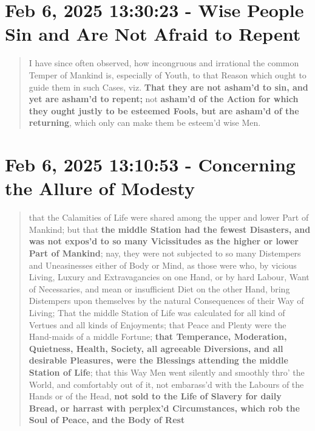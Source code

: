 \documentclass[a4paper]{article}
\begin{document}
\section{Feb 6, 2025 13:30:23 - Wise People Sin and Are Not Afraid to Repent}
\label{SEC6}



\noindent
\begin{minipage}{1\textwidth}
\vspace{1em}
\begin{quotation}
{\ttfamily

I have since often observed, how incongruous and irrational the common Temper of Mankind is, especially of Youth, to that Reason which ought to guide them in such Cases, viz. \textbf{That they are not asham’d to sin, and yet are asham’d to repent;} not \textbf{asham’d of the Action for which they ought justly to be esteemed Fools, but are asham’d of the returning}, which only can make them be esteem’d wise Men.

}
\end{quotation}
\vspace{1em}
\end{minipage}




\section{Feb 6, 2025 13:10:53 - Concerning the Allure of Modesty}
\label{SEC7}



\noindent
\begin{minipage}{1\textwidth}
\vspace{1em}
\begin{quotation}
{\ttfamily

that the Calamities of Life were shared among the upper and lower Part of Mankind; but that \textbf{the middle Station had the fewest Disasters, and was not expos’d to so many Vicissitudes as the higher or lower Part of Mankind}; nay, they were not subjected to so many Distempers and Uneasinesses either of Body or Mind, as those were who, by vicious Living, Luxury and Extravagancies on one Hand, or by hard Labour, Want of Necessaries, and mean or insufficient Diet on the other Hand, bring Distempers upon themselves by the natural Consequences of their Way of Living; That the middle Station of Life was calculated for all kind of Vertues and all kinds of Enjoyments; that Peace and Plenty were the Hand-maids of a middle Fortune; \textbf{that Temperance, Moderation, Quietness, Health, Society, all agreeable Diversions, and all desirable Pleasures, were the Blessings attending the middle Station of Life}; that this Way Men went silently and smoothly thro’ the World, and comfortably out of it, not embarass’d with the Labours of the Hands or of the Head, \textbf{not sold to the Life of Slavery for daily Bread, or harrast with perplex’d Circumstances, which rob the Soul of Peace, and the Body of Rest}

}
\end{quotation}
\vspace{1em}
\end{minipage}
\end{document}
